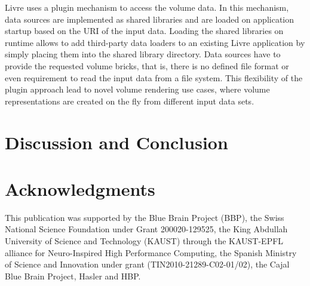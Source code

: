 \documentclass[10pt]{llncs}
\begin{document}
Livre uses a plugin mechanism to access the volume data. In this mechanism, data
sources are implemented as shared libraries and are loaded on application
startup based on the URI of the input data. Loading the shared libraries on
runtime allows to add third-party data loaders to an existing Livre application
by simply placing them into the shared library directory. Data sources have to
provide the requested volume bricks, that is, there is no defined file format or
even requirement to read the input data from a file system. This flexibility of
the plugin approach lead to novel volume rendering use cases, where volume
representations are created on the fly from different input data sets.


\section{Discussion and Conclusion}
\label{sec:conclusions}

\section*{Acknowledgments}
This publication was supported by the Blue Brain Project (BBP), the Swiss
National Science Foundation under Grant 200020-129525, the King Abdullah
University of Science and Technology (KAUST) through the KAUST-EPFL alliance for
Neuro-Inspired High Performance Computing, the Spanish Ministry of Science and
Innovation under grant (TIN2010-21289-C02-01/02), the Cajal Blue Brain Project,
Hasler and HBP.





\end{document}
